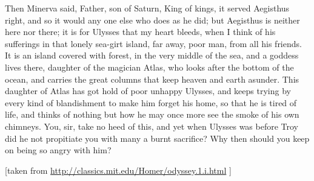 Then Minerva said, Father, son of Saturn, King of kings, it served Aegisthus right, and so it would any one else who does as he did; but Aegisthus is neither here nor there; it is for Ulysses that my heart bleeds, when I think of his sufferings in that lonely sea-girt island, far away, poor man, from all his friends. It is an island covered with forest, in the very middle of the sea, and a goddess lives there, daughter of the magician Atlas, who looks after the bottom of the ocean, and carries the great columns that keep heaven and earth asunder. This daughter of Atlas has got hold of poor unhappy Ulysses, and keeps trying by every kind of blandishment to make him forget his home, so that he is tired of life, and thinks of nothing but how he may once more see the smoke of his own chimneys. You, sir, take no heed of this, and yet when Ulysses was before Troy did he not propitiate you with many a burnt sacrifice? Why then should you keep on being so angry with him?

[taken from \url{http://classics.mit.edu/Homer/odyssey.1.i.html} ]